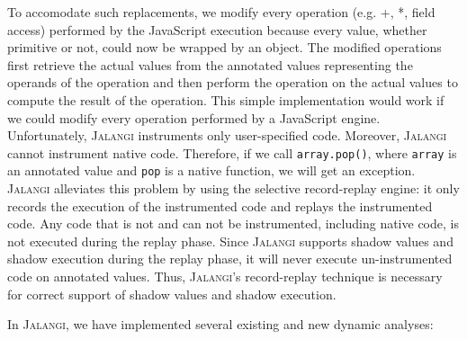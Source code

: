 \documentclass{sig-alternate}
\def\jalangi{\textsc{Jalangi}}
\begin{document}
\begin{enumerate}
  To accomodate such replacements, we modify every operation (e.g. +,
  *, field access) performed by the JavaScript execution because every
  value, whether primitive or not, could now be wrapped by an object.
  The modified operations first retrieve the actual values from the
  annotated values representing the operands of the operation and then
  perform the operation on the actual values to compute the result of
  the operation.  This simple implementation would work if we could
  modify every operation performed by a JavaScript engine.
  Unfortunately, \jalangi{} instruments only user-specified
  code. Moreover, \jalangi{} cannot instrument native code.
  Therefore, if we call \texttt{array.pop()}, where \texttt{array} is
  an annotated value and \texttt{pop} is a native function, we will
  get an exception.  \jalangi{} alleviates this problem by using the
  selective record-replay engine: it only records the execution of the
  instrumented code and replays the instrumented code.  Any code that
  is not and can not be instrumented, including native code, is not
  executed during the replay phase.  Since \jalangi{} supports shadow
  values and shadow execution during the replay phase, it will never
  execute un-instrumented code on annotated values.  Thus, \jalangi's
  record-replay technique is necessary for correct support of shadow
  values and shadow execution.
\end{enumerate}

In \jalangi{}, we have implemented several existing and new dynamic
analyses:
\end{document}

